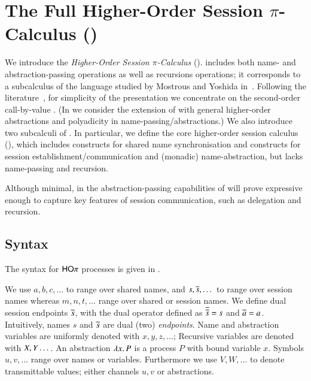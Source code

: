 
\section{The Full Higher-Order Session $\pi$-Calculus (\HOp)}
\label{sec:calculus}

We introduce the 
\emph{Higher-Order Session $\pi$-Calculus} (\HOp).
\HOp includes both name- and abstraction-passing operations
as well as recursions operations; it corresponds to a subcalculus 
of the language
studied by Mostrous and Yoshida
in~\cite{tlca07}. 
Following the literature~\cite{JeffreyR05},
for simplicity of the presentation
we concentrate on the second-order call-by-value \HOp.  
(In  we consider the extension of 
\HOp with general higher-order abstractions 
and polyadicity in name-passing/abstractions.)
We also introduce two subcalculi of \HOp. In particular, we define the 
core higher-order session
calculus (\HO), which 
includes constructs for shared name synchronisation and 
constructs for session establish\-ment/communication and 
(monadic) name-abstraction, but lacks name-passing and recursion.

Although minimal, in 
the abstraction-passing capabilities of \HOp will prove 
expressive enough to capture key features of session communication, 
such as delegation and recursion.



\subsection{Syntax} 


The syntax for $\mathsf{HO}\pi$ processes is given in .

We use $a,b,c, \dots$ to range over shared names, and
$s, \overline{s}, \dots$ to range over session names
whereas $m, n, t, \dots$ range over shared or session names.
We define dual session endpoints $\overline{s}$,
with the dual operator defined as
$\overline{\overline{s}} = s$ and $\overline{a} = a$.
Intuitively, names $s$ and $\overline{s}$ are dual (two) \emph{endpoints}.
Name and abstraction variables are uniformly denoted with $x, y, z, \dots$;
Recursive variables are denoted with $X, Y \dots$.
An abstraction $\lambda x.\,P$ is a process $P$ with bound variable $x$.
Symbols $u, v, \dots$ range over names or variables. Furthermore
we use $V, W, \dots$ to denote transmittable values; either channels $u, v$ or
abstractions.

